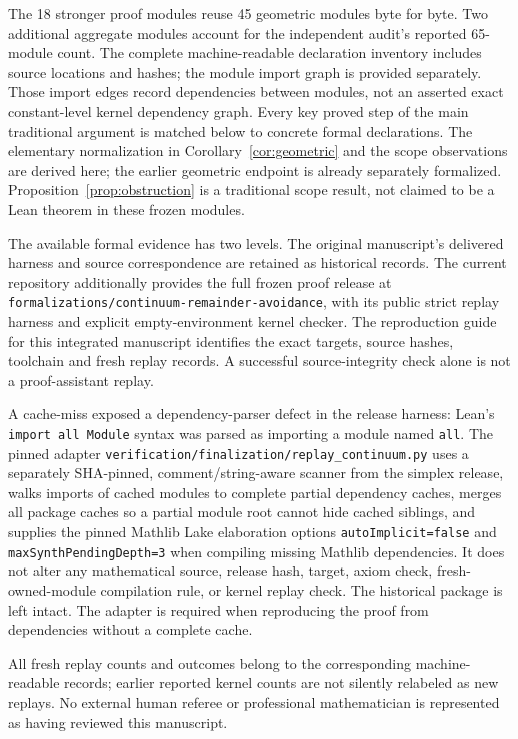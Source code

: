 \documentclass[11pt]{article}
\theoremstyle{definition}
\theoremstyle{remark}
\newcommand{\code}[1]{{\small\nolinkurl{#1}}}
\begin{document}
The 18 stronger proof modules reuse 45 geometric modules byte for byte.
Two additional aggregate modules account for the independent audit's reported
65-module count. The complete machine-readable declaration inventory includes
source locations and hashes; the module import graph is provided separately.
Those import edges record dependencies between modules, not an asserted exact
constant-level kernel dependency graph. Every key proved step of the main
traditional argument is matched below to concrete formal declarations.
The elementary normalization in Corollary~\ref{cor:geometric} and the scope
observations are derived here; the earlier geometric endpoint is already
separately formalized. Proposition~\ref{prop:obstruction} is a traditional
scope result, not claimed to be a Lean theorem in these frozen modules.

The available formal evidence has two levels. The original manuscript's
delivered harness and source correspondence are retained as historical records.
The current repository additionally provides the full frozen proof release at
\nolinkurl{formalizations/continuum-remainder-avoidance}, with its public
strict replay harness and explicit empty-environment kernel checker. The
reproduction guide for this integrated manuscript identifies the exact
targets, source hashes, toolchain and fresh replay records. A successful
source-integrity check alone is not a proof-assistant replay.

A cache-miss exposed a dependency-parser defect in the release harness:
Lean's \code{import all Module} syntax was parsed as importing a module named
\code{all}. The pinned adapter
\nolinkurl{verification/finalization/replay_continuum.py}
uses a separately SHA-pinned, comment/string-aware scanner from the simplex
release, walks imports of cached modules to complete partial dependency caches,
merges all package caches so a partial module root cannot hide cached siblings,
and supplies the pinned Mathlib Lake elaboration options
\code{autoImplicit=false} and \code{maxSynthPendingDepth=3} when compiling
missing Mathlib dependencies. It does not alter any mathematical source,
release hash, target, axiom check, fresh-owned-module compilation rule, or
kernel replay check. The historical package is left intact. The adapter is
required when reproducing the proof from dependencies without a complete cache.

All fresh replay counts and outcomes belong to the corresponding machine-readable
records; earlier reported kernel counts are not silently relabeled as new
replays. No external human referee or professional mathematician is represented
as having reviewed this manuscript.
\end{document}
